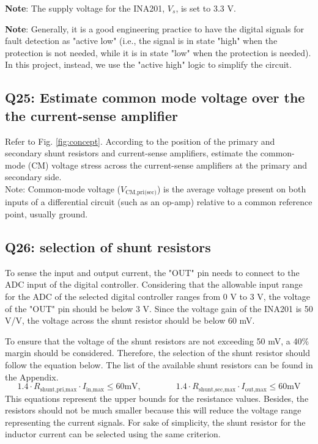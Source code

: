 \documentclass{PELsmallreport}
\begin{document}
\textbf{Note}: The supply voltage for the INA201, $V_s$, is set to 3.3 V.

\textbf{Note}: Generally, it is a good engineering practice to have the digital signals for fault detection as "active low" (i.e., the signal is in state "high" when the protection is not needed, while it is in state "low" when the protection is needed). In this project, instead, we use the "active high" logic to simplify the circuit. 

\subsection{Q25: Estimate common mode voltage over the the current-sense amplifier}
Refer to Fig. \ref{fig:concept}. According to the position of the primary and secondary shunt resistors and current-sense amplifiers, estimate the common-mode (CM) voltage stress across the current-sense amplifiers at the primary and secondary side. \\

Note: Common-mode voltage ($V_\text{CM,pri(sec)}$) is the average voltage present on both inputs of a differential circuit (such as an op-amp) relative to a common reference point, usually ground.\\

 \quad {}\hfill{}


\subsection{Q26: selection of shunt resistors}
To sense the input and output current, the "OUT" pin needs to connect to the ADC input of the digital controller. Considering that the allowable input range for the ADC of the selected digital controller ranges from 0 V to 3 V, the voltage of the "OUT" pin should be below 3 V. Since the voltage gain of the INA201 is 50 V/V, the voltage across the shunt resistor should be below 60 mV.  

To ensure that the voltage of the  shunt resistors are not exceeding 50 mV, a 40\% margin should be considered. Therefore, the selection of the shunt resistor should follow the equation below. The list of the available shunt resistors can be found in the Appendix.
\begin{equation}
    1.4 \cdot R_\text{shunt,pri,max} \cdot I_\text{in,max} \leq 60 \text{mV}, \qquad \qquad 1.4 \cdot R_\text{shunt,sec,max}  \cdot I_\text{out,max} \leq 60 \text{mV}
\end{equation}
This equations represent the upper bounds for the resistance values. Besides, the resistors should not be much smaller because this will reduce the voltage range representing the current signals.
For sake of simplicity, the shunt resistor for the inductor current can be selected using the same criterion. 
\end{document}
